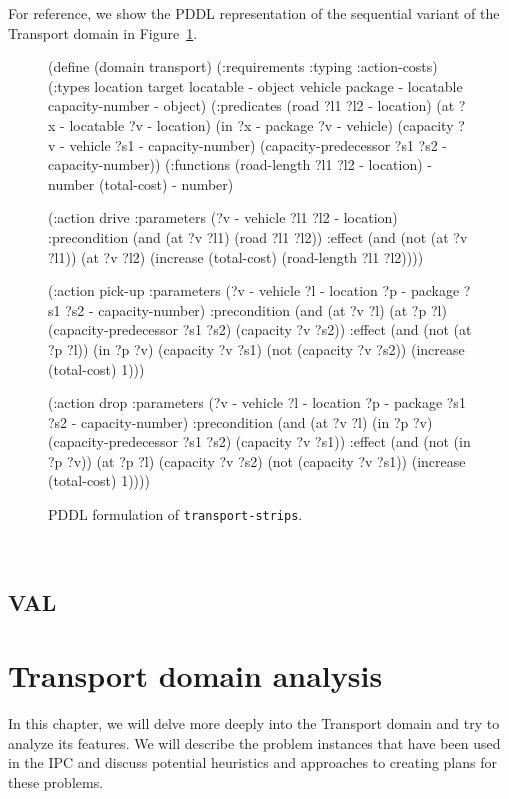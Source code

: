 For reference, we show the PDDL representation of the sequential variant of
the Transport domain in Figure~\ref{code:pddl-strips}.

\begin{figure}[htb]
\begin{code}
(define (domain transport)
  (:requirements :typing :action-costs)
  (:types
        location target locatable - object
        vehicle package - locatable
        capacity-number - object)
  (:predicates 
     (road ?l1 ?l2 - location)
     (at ?x - locatable ?v - location)
     (in ?x - package ?v - vehicle)
     (capacity ?v - vehicle ?s1 - capacity-number)
     (capacity-predecessor ?s1 ?s2 - capacity-number))
  (:functions
     (road-length ?l1 ?l2 - location) - number
     (total-cost) - number)
     
  (:action drive
    :parameters (?v - vehicle ?l1 ?l2 - location)
    :precondition (and (at ?v ?l1) (road ?l1 ?l2))
    :effect (and (not (at ?v ?l1)) (at ?v ?l2)
        (increase (total-cost) (road-length ?l1 ?l2))))
        
 (:action pick-up
    :parameters (?v - vehicle ?l - location ?p - package
                 ?s1 ?s2 - capacity-number)
    :precondition (and (at ?v ?l) (at ?p ?l)
        (capacity-predecessor ?s1 ?s2) (capacity ?v ?s2))
    :effect (and (not (at ?p ?l)) (in ?p ?v) (capacity ?v ?s1)
        (not (capacity ?v ?s2)) (increase (total-cost) 1)))
        
  (:action drop
    :parameters (?v - vehicle ?l - location ?p - package
                 ?s1 ?s2 - capacity-number)
    :precondition (and (at ?v ?l) (in ?p ?v)
        (capacity-predecessor ?s1 ?s2) (capacity ?v ?s1))
    :effect (and (not (in ?p ?v)) (at ?p ?l) (capacity ?v ?s2)
        (not (capacity ?v ?s1)) (increase (total-cost) 1))))
\end{code}
\caption{PDDL formulation of \texttt{transport-strips}.}
\label{code:pddl-strips}
\end{figure}

\

\subsection{VAL}\label{val}

\section{Transport domain analysis}

In this chapter, we will delve more deeply into the Transport domain and try to analyze its features.
We will describe the problem instances that have been used in the IPC and discuss potential
heuristics and approaches to creating plans for these problems.

